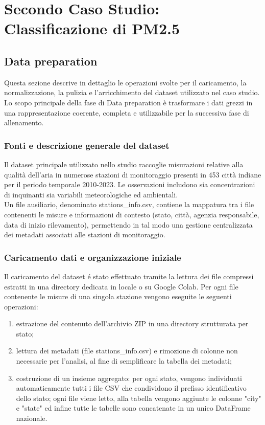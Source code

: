 \documentclass[a4paper,12pt]{report}
\begin{document}
	\chapter{Secondo Caso Studio: Classificazione di PM2.5}
	
	\section{Data preparation}
	
	Questa sezione descrive in dettaglio le operazioni svolte per il caricamento, la normalizzazione, la pulizia e l'arricchimento del dataset utilizzato nel caso studio. Lo scopo principale della fase di Data preparation è trasformare i dati grezzi in una rappresentazione coerente, completa e utilizzabile per la successiva fase di allenamento.
	
	\subsection{Fonti e descrizione generale del dataset}
	Il dataset principale utilizzato nello studio raccoglie misurazioni relative alla qualità dell'aria in numerose stazioni di monitoraggio presenti in 453 città indiane per il periodo temporale 2010-2023. Le osservazioni includono sia concentrazioni di inquinanti sia variabili meteorologiche ed ambientali.\\
	Un file ausiliario, denominato stations\_info.csv, contiene la mappatura tra i file contenenti le misure e informazioni di contesto (stato, città, agenzia responsabile, data di inizio rilevamento), permettendo in tal modo una gestione centralizzata dei metadati associati alle stazioni di monitoraggio.
	
	\subsection{Caricamento dati e organizzazione iniziale}
	Il caricamento del dataset é stato effettuato tramite la lettura dei file compressi estratti in una directory dedicata in locale o su Google Colab. Per ogni file contenente le misure di una singola stazione vengono eseguite le seguenti operazioni:
	
	\begin{enumerate}
		\item estrazione del contenuto dell'archivio ZIP in una directory strutturata per stato;
		\item lettura dei metadati (file stations\_info.csv) e rimozione di colonne non necessarie per l'analisi, al fine di semplificare la tabella dei metadati;
		\item costruzione di un insieme aggregato: per ogni stato, vengono individuati automaticamente tutti i file CSV che condividono il prefisso identificativo dello stato; ogni file viene letto, alla tabella vengono aggiunte le colonne "city" e "state" ed infine tutte le tabelle sono concatenate in un unico DataFrame nazionale.
	\end{enumerate}
	
\end{document}
